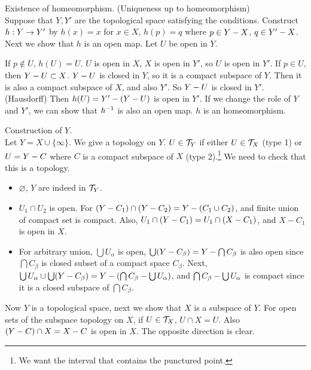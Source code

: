 \pf {} Existence of homeomorphism. (Uniqueness up to homeomorphism) \\
Suppose that \(Y, Y'\) are the topological space satisfying the conditions. Construct \(h : Y \rightarrow Y'\) by \(h(x) = x\) for \(x \in X\), \(h(p) = q\) where \(p \in Y - X\), \(q \in Y' - X\). Next we show that \(h\) is an open map. Let \(U\) be open in \(Y\).

If \(p \notin U\), \(h(U) = U\). \(U\) is open in \(X\), \(X\) is open in \(Y'\), so \(U\) is open in \(Y'\). If \(p \in U\), then \(Y - U \subset X\). \(Y - U\) is closed in \(Y\), so it is a compact subspace of \(Y\). Then it is also a compact subspace of \(X\), and also \(Y'\). So \(Y - U\) is closed in \(Y'\). (Hausdorff) Then \(h(U) = Y' - (Y - U)\) is open in \(Y'\). If we change the role of \(Y\) and \(Y'\), we can show that \(h^{-1}\) is also an open map. \(h\) is an homeomorphism.

 \note{\mimp} Construction of \(Y\). \\
Let \(Y = X \cup \{\infty\}\). We give a topology on \(Y\). \(U \in \mathcal{T}_Y\) if either \(U \in \mathcal{T}_X\) (type 1) or \(U = Y - C\) where \(C\) is a compact subspace of \(X\) (type 2).\footnote{We want the interval that contains the punctured point.} We need to check that this is a topology.
\begin{itemize}
    \item \(\varnothing\), \(Y\) are indeed in \(\mathcal{T}_Y\).
    \item \(U_1\cap U_2\) is open. For \((Y - C_1) \cap (Y - C_2) = Y - (C_1 \cup C_2)\), and finite union of compact set is compact. Also, \(U_1 \cap (Y - C_1) = U_1 \cap (X - C_1)\), and \(X - C_1\) is open in \(X\).
    \item For arbitrary union, \(\bigcup U_\alpha\) is open, \(\bigcup (Y - C_\beta) = Y - \bigcap C_\beta\) is also open since \(\bigcap C_\beta\) is closed subset of a compact space \(C_\beta\). Next, \(\bigcup U_\alpha \cup \bigcup (Y - C_\beta) = Y - (\bigcap C_\beta - \bigcup U_\alpha)\), and \(\bigcap C_\beta - \bigcup U_\alpha\) is compact since it is a closed subspace of \(\bigcap C_\beta\).
\end{itemize}

Now \(Y\) is a topological space, next we show that \(X\) is a subspace of \(Y\). For open sets of the subspace topology on \(X\), if \(U \in \mathcal{T}_X\), \(U \cap X = U\). Also \((Y - C) \cap X = X - C\) is open in \(X\). The opposite direction is clear.

